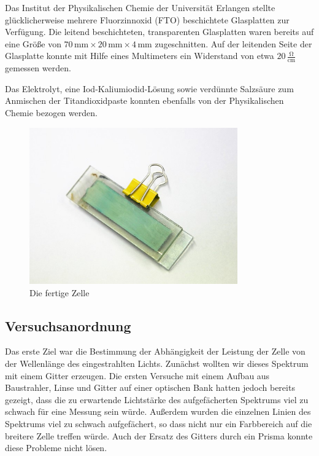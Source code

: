 \documentclass[11pt]{scrartcl}
\newcommand{\unit}[1]{\ensuremath{\,\mathrm{#1}}} %
\begin{document}
Das Institut der Physikalischen Chemie der Universit\"at Erlangen stellte gl\"ucklicherweise mehrere Fluorzinnoxid (FTO) beschichtete Glasplatten zur Verf\"ugung. Die leitend beschichteten, transparenten Glasplatten waren bereits auf eine Gr\"o\ss{}e von \(70\unit{mm} \times 20\unit{mm} \times 4 \unit{mm}\) zugeschnitten. Auf der leitenden Seite der Glasplatte konnte mit Hilfe eines Multimeters ein Widerstand von etwa \(20 \unit{\frac{\Omega}{cm}}\) gemessen werden.

Das Elektrolyt, eine Iod-Kaliumiodid-L\"osung sowie verd\"unnte Salzs\"aure zum Anmischen der Titandioxidpaste konnten ebenfalls von der Physikalischen Chemie bezogen werden.

\begin{figure}[ht]
\begin{center}
\includegraphics[width=0.8\textwidth]{images/zelle_gruen.jpg}
\end{center}
\vspace{-1.5\baselineskip}
\caption{Die fertige Zelle}
\label{zelle_gruen.jpg}
\end{figure}



\subsection{Versuchsanordnung} %
Das erste Ziel war die Bestimmung der Abh\"angigkeit der Leistung der Zelle von der Wellenl\"ange des eingestrahlten Lichts. Zun\"achst wollten wir dieses Spektrum mit einem Gitter erzeugen. Die ersten Versuche mit einem Aufbau aus Baustrahler, Linse und Gitter auf einer optischen Bank hatten jedoch bereits gezeigt, dass die zu erwartende Lichtst\"arke des aufgef\"acherten Spektrums viel zu schwach f\"ur eine Messung sein w\"urde. Außerdem wurden die einzelnen Linien des Spektrums viel zu schwach aufgef\"achert, so dass nicht nur ein Farbbereich auf die breitere Zelle treffen w\"urde. Auch der Ersatz des Gitters durch ein Prisma konnte diese Probleme nicht l\"osen.
\end{document}
